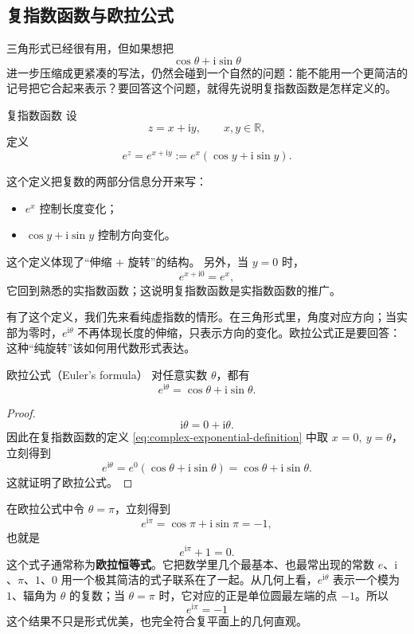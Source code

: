 \subsection{复指数函数与欧拉公式}

三角形式已经很有用，但如果想把
\[
\cos\theta+\mathrm{i}\sin\theta
\]
进一步压缩成更紧凑的写法，仍然会碰到一个自然的问题：能不能用一个更简洁的记号把它合起来表示？要回答这个问题，就得先说明复指数函数是怎样定义的。

\begin{dingliyi}{复指数函数}{}
设
\[
z=x+\mathrm{i}y,\qquad x,y\in\mathbb{R},
\]
定义
\begin{equation}\label{eq:complex-exponential-definition}
    e^z=e^{x+\mathrm{i}y}:=e^x(\cos y+\mathrm{i}\sin y).
\end{equation}
\end{dingliyi}

\begin{zhu}{}{}
这个定义把复数的两部分信息分开来写：
\begin{itemize}
    \item $e^x$ 控制长度变化；
    \item $\cos y+\mathrm{i}\sin y$ 控制方向变化。
\end{itemize}
这个定义体现了``伸缩 + 旋转''的结构。
另外，当 $y=0$ 时，
\[
e^{x+\mathrm{i}0}=e^x,
\]
它回到熟悉的实指数函数；这说明复指数函数是实指数函数的推广。
\end{zhu}

有了这个定义，我们先来看纯虚指数的情形。在三角形式里，角度对应方向；当实部为零时，$e^{\mathrm{i}\theta}$ 不再体现长度的伸缩，只表示方向的变化。欧拉公式正是要回答：这种``纯旋转''该如何用代数形式表达。

\begin{dingli}{欧拉公式（Euler's formula）}{}
对任意实数 $\theta$，都有
\begin{equation}\label{eq:euler-formula}
    e^{\mathrm{i}\theta}=\cos\theta+\mathrm{i}\sin\theta.
\end{equation}
\end{dingli}

\begin{proof}
\[
\mathrm{i}\theta=0+\mathrm{i}\theta.
\]
因此在复指数函数的定义
\eqref{eq:complex-exponential-definition} 中取 $x=0,\ y=\theta$，立刻得到
\[
e^{\mathrm{i}\theta}=e^0(\cos\theta+\mathrm{i}\sin\theta)=\cos\theta+\mathrm{i}\sin\theta.
\]
这就证明了欧拉公式。
\end{proof}
\begin{zhu}{}{}
	在欧拉公式中令 $\theta=\pi$，立刻得到
	\[
	e^{\mathrm{i}\pi}=\cos\pi+\mathrm{i}\sin\pi=-1,
	\]
	也就是
	\[
	e^{\mathrm{i}\pi}+1=0.
	\]
	这个式子通常称为\textbf{欧拉恒等式}。它把数学里几个最基本、也最常出现的常数 $e$、$\mathrm{i}$、$\pi$、$1$、$0$ 用一个极其简洁的式子联系在了一起。从几何上看，$e^{\mathrm{i}\theta}$ 表示一个模为 $1$、辐角为 $\theta$ 的复数；当 $\theta=\pi$ 时，它对应的正是单位圆最左端的点 $-1$。所以
	\[
	e^{\mathrm{i}\pi}=-1
	\]
	这个结果不只是形式优美，也完全符合复平面上的几何直观。
\end{zhu}

